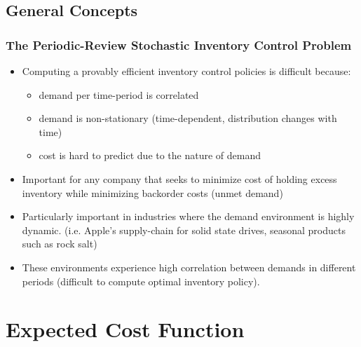 \documentclass{beamer}
\begin{document}
  \subsection{General Concepts}
  \begin{frame}
    \frametitle{The Periodic-Review Stochastic Inventory Control Problem}
    \begin{itemize}
      \item Computing a provably efficient inventory control policies is difficult because:
        \begin{itemize}
          \item demand per time-period is correlated
          \item demand is non-stationary (time-dependent, distribution changes with time)
          \item cost is hard to predict due to the nature of demand
        \end{itemize}
      \item Important for any company that seeks to minimize cost of holding excess inventory while minimizing backorder costs (unmet demand)
      \item Particularly important in industries where the demand environment is highly dynamic. (i.e. Apple's supply-chain for solid state drives, seasonal products such as rock salt)
      \item These environments experience high correlation between demands in different periods (difficult to compute optimal inventory policy).
    \end{itemize}
  \end{frame}
  \section{Expected Cost Function}
\end{document}
